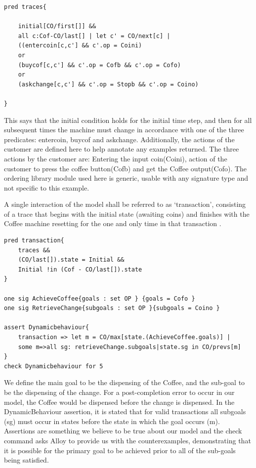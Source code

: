 \documentclass[a4paper,12pt]{report}
\begin{document}
\begin{onehalfspacing}
\begin{verbatim}
pred traces{

	initial[CO/first[]] &&
	all c:Cof-CO/last[] | let c' = CO/next[c] |
	((entercoin[c,c'] && c'.op = Coini)
	or
	(buycof[c,c'] && c'.op = Cofb && c'.op = Cofo)
	or
	(askchange[c,c'] && c'.op = Stopb && c'.op = Coino)

}
\end{verbatim}

This says that the initial condition holds for the initial time step, and then for all subsequent times the machine must change in accordance with one of the three predicates: entercoin, buycof and askchange. Additionally, the actions of the customer are defined here to help annotate any examples returned. The three actions by the customer are: Entering the input coin(Coini), action of the customer to press the coffee button(Cofb) and get the Coffee output(Cofo). The ordering library module used here is generic, usable with any signature type and not specific to this example.

A single interaction of the model shall be referred to as `transaction’, consisting of a trace that begins with the initial state (awaiting coins) and finishes with the Coffee machine resetting for the one and only time in that transaction \cite{RussellBoyatt}.

\begin{verbatim}
pred transaction{
	traces &&
	(CO/last[]).state = Initial &&
	Initial !in (Cof - CO/last[]).state
}

one sig AchieveCoffee{goals : set OP } {goals = Cofo }
one sig RetrieveChange{subgoals : set OP }{subgoals = Coino }

assert Dynamicbehaviour{
	transaction => let m = CO/max[state.(AchieveCoffee.goals)] |
	some m=>all sg: retrieveChange.subgoals|state.sg in CO/prevs[m]
}
check Dynamicbehaviour for 5

\end{verbatim}

We define the main goal to be the dispensing of the Coffee, and the sub-goal to be the dispensing of the change. For a post-completion error to occur in our model, the Coffee would be dispensed before the change is dispensed. In the DynamicBehaviour assertion, it is stated that for valid transactions all subgoals (sg) must occur in states before the state in which the goal occurs (m). Assertions are something we believe to be true about our model and the check command asks Alloy to provide us with the counterexamples, demonstrating that it is possible for the primary goal to be achieved prior to all of the sub-goals being satisfied.


\end{onehalfspacing}
\end{document}
